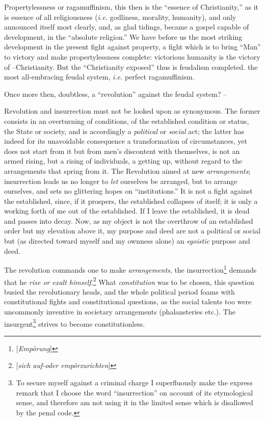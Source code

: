\documentclass[12pt,a4paper]{book}
\begin{document}
Propertylessness or ragamuffinism, this then is the ``essence of 
Christianity,'' as it is essence of all religiousness (\textit{i.e.} 
godliness, morality, humanity), and only announced itself most clearly, and, 
as glad tidings, became a gospel capable of development, in the ``absolute 
religion.'' We have before us the most striking development in the present 
fight against property, a fight which is to bring ``Man'' to victory and 
make propertylessness complete: victorious humanity is the victory of 
--Christianity. But the ``Christianity exposed'' thus is feudalism 
completed. the most all-embracing feudal system, \textit{i.e.} perfect 
ragamuffinism.

Once more then, doubtless, a ``revolution'' against the feudal system? --

Revolution and insurrection must not be looked upon as synonymous. The former 
consists in an overturning of conditions, of the established condition or 
status, the State or society, and is accordingly a \textit{political} or 
\textit{social} act; the latter has indeed for its unavoidable consequence a 
transformation of circumstances, yet does not start from it but from men's 
discontent with themselves, is not an armed rising, but a rising of 
individuals, a getting up, without regard to the arrangements that spring from 
it. The Revolution aimed at new \textit{arrangements}; insurrection leads us 
no longer to \textit{let} ourselves be arranged, but to arrange ourselves, and 
sets no glittering hopes on ``institutions.'' It is not a fight against the 
established, since, if it prospers, the established collapses of itself; it is 
only a working forth of me out of the established. If I leave the established, 
it is dead and passes into decay. Now, as my object is not the overthrow of an 
established order but my elevation above it, my purpose and deed are not a 
political or social but (as directed toward myself and my ownness alone) an 
\textit{egoistic} purpose and deed.

The revolution commands one to make \textit{arrangements}, the 
insurrection\footnote{[\textit{Emp\"orung}]} demands that he \textit{rise or 
exalt himself}.\footnote{[\textit{sich auf-oder emp\"orzurichten}]} What 
\textit{constitution} was to be chosen, this question busied the revolutionary 
heads, and the whole political period foams with constitutional fights and 
constitutional questions, as the social talents too were uncommonly inventive 
in societary arrangements (phalansteries etc.). The insurgent\footnote{To 
secure myself against a criminal charge I superfluously make the express 
remark that I choose the word ``insurrection'' on account of its 
etymological sense, and therefore am not using it in the limited sense which 
is disallowed by the penal code.} strives to become constitutionless.
\end{document}
